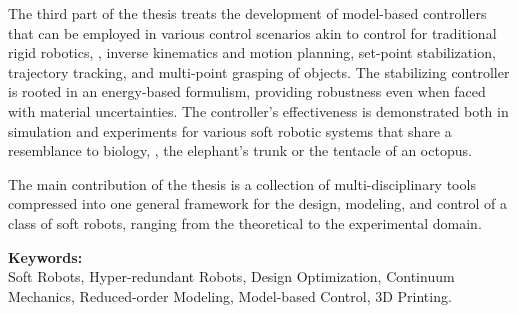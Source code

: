 The third part of the thesis treats the development of model-based controllers that can be employed in various control scenarios akin to control for traditional rigid robotics, \eg, inverse kinematics and motion planning, set-point stabilization, trajectory tracking, and multi-point grasping of objects. The stabilizing controller is rooted in an energy-based formulism, providing robustness even when faced with material uncertainties. The controller's effectiveness is demonstrated both in simulation and experiments for various soft robotic systems that share a resemblance to biology, \eg, the elephant's trunk or the tentacle of an octopus.

The main contribution of the thesis is a collection of multi-disciplinary tools compressed into one general framework for the design, modeling, and control of a class of soft robots, ranging from the theoretical to the experimental domain.

\vspace*{5pt}\noindent
\textbf{Keywords:} \\ Soft Robots, Hyper-redundant Robots, Design Optimization, Continuum Mechanics, Reduced-order Modeling, Model-based Control, 3D Printing.
